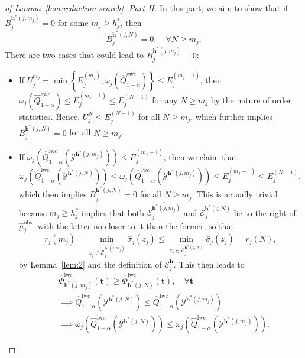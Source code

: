 \begin{proof}[of Lemma~\ref{lem:reduction-search}]
\textit{Part II.} In this part, we aim to show that if $B_j^{\mathbf{h}^*(j,m_j)} =0$ for some $m_j \geq h^*_j$, then
\[
B_j^{\mathbf{h}^*(j,N)} = 0, \quad \forall N\geq m_j.
\]
There are two cases that could lead to $B_j^{\mathbf{h}^*(j,m_j)} =0$:
    \begin{itemize}
        \item If $U^{m_j}_j = \min\left\{E^{(m_j)}_j,\omega_j(\hat{Q}^{\mathrm{gwc}}_{1-\alpha})\right\} \leq E^{(m_j-1)}_j$, then $\omega_j(\hat{Q}^\mathrm{gwc}_{1-\alpha}) \leq E^{(m_j-1)}_j \leq E^{(N-1)}_j$ for any $N\geq m_j$ by the nature of order statistics. Hence, $U^N_j \leq E^{(N-1)}_j$ for all $N\geq m_j$, which further implies $B_j^{\mathbf{h}^*(j,N)} = 0$ for all $N\geq m_j$.
        \item If $\omega_j(\hat{Q}^\mathrm{lwc}_{1-\alpha} (\mathcal{Y}^{\mathbf{h}^*(j,m_j)})) \leq E^{(m_j-1)}_j$, then we claim that
        \[
        \omega_j(\hat{Q}^\mathrm{lwc}_{1-\alpha} (\mathcal{Y}^{\mathbf{h}^*(j,N)})) \leq \omega_j(\hat{Q}^\mathrm{lwc}_{1-\alpha} (\mathcal{Y}^{\mathbf{h}^*(j,m_j)})) \leq E^{(m_j-1)}_j \leq E^{(N-1)}_j,
        \]
        which then implies $B_j^{\mathbf{h}^*(j,N)} =0$ for all $N\geq m_j$.
        This is actually trivial because $m_j \geq h^*_j$ implies that both $\overline{\mathcal{E}^{\mathbf{h}^*(j,m_j)}_j}$ and $\overline{\mathcal{E}^{\mathbf{h}^*(j,N)}_j}$ lie to the right of $\hat{\mu}^\mathrm{obs}_j$, with the latter no closer to it than the former, so that
        \[
        r_j(m_j) = \min_{z_j \in \overline{\mathcal{E}^{\mathbf{h}^*(j, m_j)}_j}} \hat{\sigma}_j(z_j) \leq \min_{z_j \in \overline{\mathcal{E}^{\mathbf{h}^*(j,N)}_j}} \hat{\sigma}_j(z_j) = r_j(N),
        \]
        by Lemma~\ref{lem:2} and the definition of $\mathcal{E}^{\mathbf{h}}_j$. This then leads to
        \begin{align*}
            &\hat{\Phi}^{\mathrm{lwc}}_{\mathbf{h}^*(j, m_j)}(\mathbf t) \geq \hat{\Phi}^{\mathrm{lwc}}_{\mathbf{h}^*(j,N)}(\mathbf t), \quad \forall \mathbf t\\
            &\implies \hat{Q}^\mathrm{lwc}_{1-\alpha} (\mathcal{Y}^{\mathbf{h}^*(j,N)}) \leq \hat{Q}^\mathrm{lwc}_{1-\alpha}(\mathcal{Y}^{\mathbf{h}^*(j, m_j)})\\
            &\implies \omega_j(\hat{Q}^\mathrm{lwc}_{1-\alpha} (\mathcal{Y}^{\mathbf{h}^*(j,N)})) \leq \omega_j(\hat{Q}^\mathrm{lwc}_{1-\alpha} (\mathcal{Y}^{\mathbf{h}^*(j,m_j)})).
        \end{align*}
    \end{itemize}
\end{proof}


\clearpage


